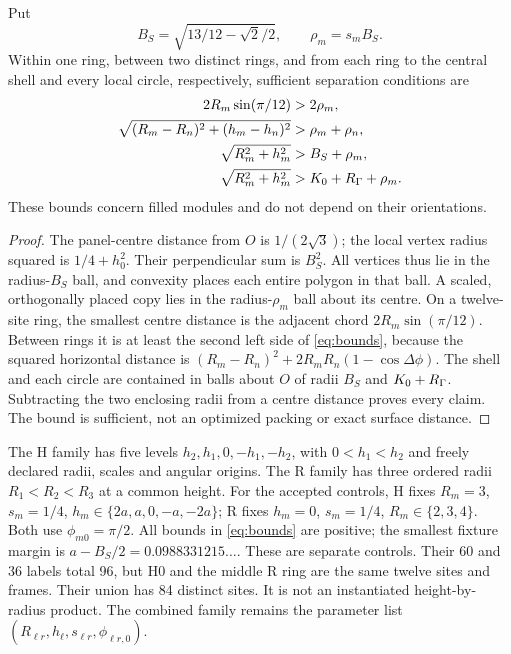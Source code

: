 \begin{proposition}\label{prop:balls}
Put
\[
B_S=\sqrt{13/12-\sqrt2/2},\qquad \rho_m=s_mB_S.
\]
Within one ring, between two distinct rings, and from each ring to the central shell and every local circle, respectively, sufficient separation conditions are
\begin{equation}\label{eq:bounds}
\begin{aligned}
2R_m\sin(\pi/12)&>2\rho_m,\\
\sqrt{(R_m-R_n)^2+(h_m-h_n)^2}&>\rho_m+\rho_n,\\
\sqrt{R_m^2+h_m^2}&>B_S+\rho_m,\\
\sqrt{R_m^2+h_m^2}&>K_0+R_\Gamma+\rho_m.
\end{aligned}
\end{equation}
These bounds concern filled modules and do not depend on their orientations.
\end{proposition}
\begin{proof}
The panel-centre distance from $O$ is $1/(2\sqrt3)$; the local vertex radius squared is $1/4+h_0^2$. Their perpendicular sum is $B_S^2$. All vertices thus lie in the radius-$B_S$ ball, and convexity places each entire polygon in that ball. A scaled, orthogonally placed copy lies in the radius-$\rho_m$ ball about its centre. On a twelve-site ring, the smallest centre distance is the adjacent chord $2R_m\sin(\pi/12)$. Between rings it is at least the second left side of \eqref{eq:bounds}, because the squared horizontal distance is $(R_m-R_n)^2+2R_mR_n(1-\cos\Delta\phi)$. The shell and each circle are contained in balls about $O$ of radii $B_S$ and $K_0+R_\Gamma$. Subtracting the two enclosing radii from a centre distance proves every claim. The bound is sufficient, not an optimized packing or exact surface distance.
\end{proof}

The H family has five levels $h_2,h_1,0,-h_1,-h_2$, with $0<h_1<h_2$ and freely declared radii, scales and angular origins. The R family has three ordered radii $R_1<R_2<R_3$ at a common height. For the accepted controls, H fixes $R_m=3$, $s_m=1/4$, $h_m\in\{2a,a,0,-a,-2a\}$; R fixes $h_m=0$, $s_m=1/4$, $R_m\in\{2,3,4\}$. Both use $\phi_{m0}=\pi/2$. All bounds in \eqref{eq:bounds} are positive; the smallest fixture margin is $a-B_S/2=0.0988331215\ldots$. These are separate controls. Their 60 and 36 labels total 96, but H0 and the middle R ring are the same twelve sites and frames. Their union has 84 distinct sites. It is not an instantiated height-by-radius product. The combined family remains the parameter list $(R_{\ell r},h_\ell,s_{\ell r},\phi_{\ell r,0})$.

